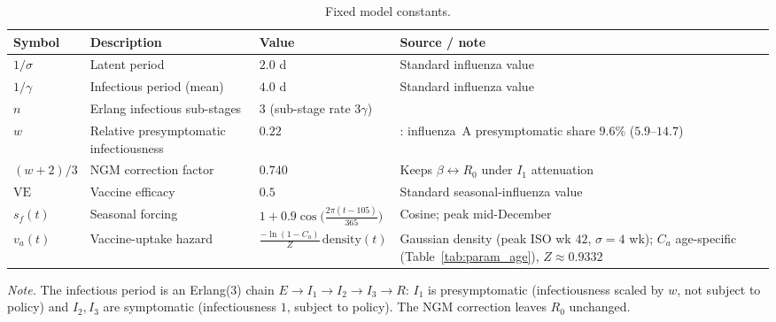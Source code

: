 \documentclass[12pt]{article}
\theoremstyle{plain}
\theoremstyle{remark}
\theoremstyle{definition}
\begin{document}
\begin{table}[H]
\centering
\caption{Fixed model constants.}
\label{tab:param_fixed}
\small
\begin{tabular}{@{}l p{3.5cm} p{4.0cm} p{4.4cm}@{}}
\toprule
Symbol & Description & Value & Source / note \\
\midrule
$1/\sigma$ & Latent period & $2.0$ d & Standard influenza value \\
$1/\gamma$ & Infectious period (mean) & $4.0$ d & Standard influenza value \\
$n$ & Erlang infectious sub-stages & $3$ (sub-stage rate $3\gamma$) & \cite{Wearing2005} \\
$w$ & Relative presymptomatic infectiousness & $0.22$ & \cite{NatureHealth2026}: influenza~A presymptomatic share $9.6\%$ ($5.9$--$14.7$) \\
$(w{+}2)/3$ & NGM correction factor & $0.740$ & Keeps $\beta\!\leftrightarrow\!R_0$ under $I_1$ attenuation \\
$\mathrm{VE}$ & Vaccine efficacy & $0.5$ & Standard seasonal-influenza value \\
$s_f(t)$ & Seasonal forcing & $1+0.9\cos\!\big(\tfrac{2\pi(t-105)}{365}\big)$ & Cosine; peak mid-December \\
$v_a(t)$ & Vaccine-uptake hazard & $\tfrac{-\ln(1-C_a)}{Z}\,\mathrm{density}(t)$ & Gaussian density (peak ISO wk $42$, $\sigma{=}4$ wk); $C_a$ age-specific (Table~\ref{tab:param_age}), $Z{\approx}0.9332$ \\
\bottomrule
\end{tabular}
\par\vspace{2mm}
{\footnotesize\textit{Note.} The infectious period is an Erlang(3) chain $E\to I_1\to I_2\to I_3\to R$: $I_1$ is presymptomatic (infectiousness scaled by $w$, not subject to policy) and $I_2,I_3$ are symptomatic (infectiousness $1$, subject to policy). The NGM correction leaves $R_0$ unchanged.}
\end{table}
\end{document}
